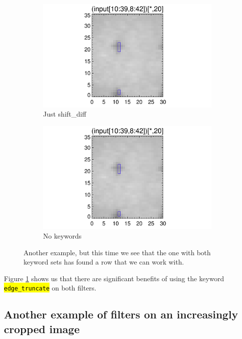 \documentclass[10pt]{article}
\begin{document}
\begin{figure}[!h]
   \begin{subfigure}[b]{.45\linewidth}
        \centering
        \includegraphics[width=1.3\textwidth]{../plots_tables_images/fidcheck_withshiftdifftruncate1.png}
        \caption{Just shift\_diff}
    \end{subfigure}
    \begin{subfigure}[b]{.45\linewidth}
        \centering
        \includegraphics[width=1.3\textwidth]{../plots_tables_images/fidcheck_withnotruncate1.png}
        \caption{No keywords}
    \end{subfigure}
    \caption{Another example, but this time we see that the one with both keyword sets has found a row that we can work with.}
    \label{whystopnow}
\end{figure}

Figure \ref{whystopnow} shows us that there are significant benefits of using the keyword \hl{\texttt{edge\_truncate}} on both filters.

\subsection{Another example of filters on an increasingly cropped image} %
\label{sub:another_example_of_filters_on_an_increasingly_cropped_image}
\end{document}
